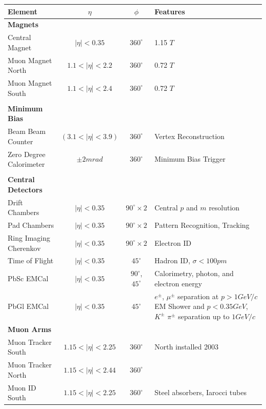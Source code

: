 \begin{table}
  \centering
  \begin{tabular}{l c c p{5cm}}
    \toprule
    \textbf{Element}	& \textbf{$\eta$}	& \textbf{$\phi$} & \textbf{Features} \\
    \midrule
    \textbf{Magnets}  & & & \\
    Central Magnet    & $ \vert\eta\vert < 0.35$ & $360^{\circ}$ & 1.15 $T$ \\ 
    Muon Magnet North & $1.1 < \vert\eta\vert < 2.2$ & $360^{\circ}$ & 0.72 $T$ \\
    Muon Magnet South & $1.1 < \vert\eta\vert < 2.4$ & $360^{\circ}$ & 0.72 $T$ \\
                      & & & \\
    \textbf{Minimum Bias} & & & \\
    Beam Beam Counter & $(3.1 < \vert\eta\vert < 3.9)$ & $360^{\circ}$ & Vertex Reconstruction \\
    Zero Degree Calorimeter & $\pm 2 mrad$ & $360^{\circ}$ & Minimum Bias Trigger \\
                            & & & \\
    \textbf{Central Detectors} & & & \\
    Drift Chambers & $\vert\eta\vert < 0.35$ & $90^{\circ}\times2$ & Central $p$ and $m$ resolution \\
    Pad Chambers & $\vert\eta\vert < 0.35$ & $90^{\circ}\times2$ & Pattern Recognition, Tracking \\
    Ring Imaging Cherenkov & $\vert\eta\vert < 0.35$ & $90^{\circ}\times2$ & Electron ID \\
    Time of Flight & $\vert\eta\vert < 0.35$ & $45^{\circ}$ & Hadron ID, $\sigma<100pm$ \\
    PbSc EMCal & $\vert\eta\vert < 0.35$ & $90^{\circ}$, $45^{\circ}$ & Calorimetry, photon, and electron energy \\
    PbGl EMCal & $\vert\eta\vert < 0.35$ & $45^{\circ}$ & $e^{\pm}$, $\mu^{\pm}$ separation at $p> 1 GeV/c$ EM Shower and $p < 0.35 GeV$, $K^{\pm}$ $\pi^{\pm}$ separation up to $1 GeV/c$ \\
    \textbf{Muon Arms} & & & \\
    Muon Tracker South & $1.15 < \vert\eta\vert < 2.25$ & $360^{\circ}$ & North installed 2003 \\
    Muon Tracker North & $1.15 < \vert\eta\vert < 2.44$   & $360^{\circ}$ &  \\
    Muon ID South & $1.15 < \vert\eta\vert < 2.25$ & $360^{\circ}$ & Steel absorbers, Iarocci tubes \\

\end{tabular}
\end{table}
